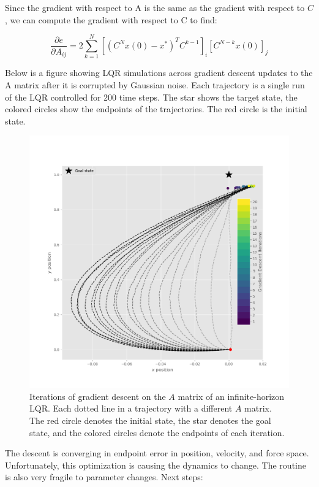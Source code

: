 \documentclass[
  a4paper,
]{article}
\begin{document}
Since the gradient with respect to A is the same as the gradient with
respect to \(C\), we can compute the gradient with respect to C to find:

\[
\frac{\partial{e}}{\partial{A_{ij}}} = 2\sum_{k=1}^N\left[(C^Nx(0) - x^*)^TC^{k-1}\right]_i\left[C^{N-k}x(0)\right]_j
\]

Below is a figure showing LQR simulations across gradient descent
updates to the A matrix after it is corrupted by Gaussian noise. Each
trajectory is a single run of the LQR controlled for 200 time steps. The
star shows the target state, the colored circles show the endpoints of
the trajectories. The red circle is the initial state.

\begin{figure}
\hypertarget{fig:gradient_descent}{%
\centering
\includegraphics{images/simulations/gradient_descent_on_A.png}
\caption{Iterations of gradient descent on the \(A\) matrix of an
infinite-horizon LQR. Each dotted line in a trajectory with a different
\(A\) matrix. The red circle denotes the initial state, the star denotes
the goal state, and the colored circles denote the endpoints of each
iteration.}\label{fig:gradient_descent}
}
\end{figure}

The descent is converging in endpoint error in position, velocity, and
force space. Unfortunately, this optimization is causing the dynamics to
change. The routine is also very fragile to parameter changes. Next
steps:
\end{document}
